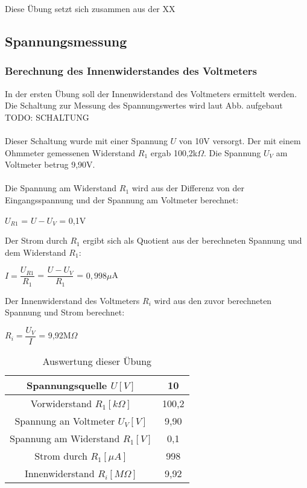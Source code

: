 Diese Übung setzt sich zusammen aus der XX

\subsection{Spannungsmessung}
\subsubsection{Berechnung des Innenwiderstandes des Voltmeters}
In der ersten Übung soll der Innenwiderstand des Voltmeters ermittelt werden. Die Schaltung zur Messung des Spannungswertes wird laut Abb. aufgebaut
~\\
TODO: SCHALTUNG		\\
~\\
Dieser Schaltung wurde mit einer Spannung $U$ von 10V versorgt. Der mit einem Ohmmeter gemessenen Widerstand $R_1$ ergab 100,2k$\Omega$. Die Spannung $U_V$ am Voltmeter betrug 9,90V.	\\
~\\
Die Spannung am Widerstand $R_1$ wird aus der Differenz von der Eingangsspannung und der Spannung am Voltmeter berechnet: 
\begin{center}
$U_{R1}$ = $U - U_V$ = 0,1V
\end{center}
Der Strom durch $R_1$ ergibt sich als Quotient aus der berechneten Spannung und dem Widerstand $R_1$:
\begin{center}
$I = \dfrac{U_{R1}}{R_1}$ = $\dfrac{U - U_V}{R_1}$ = $0,998\mu$A
\end{center}
Der Innenwiderstand des Voltmeters $R_i$ wird aus den zuvor berechneten Spannung und Strom berechnet:
\begin{center}
$R_i = \dfrac{U_V}{I}$ = 9,92M$\Omega$
\end{center}
\begin{table}[h]
	\centering
	\begin{tabular}{|c|c|}
	\hline 
	Spannungsquelle $U [V]$			& 10 		\\ 
	\hline 
	Vorwiderstand $R_1 [k\Omega]$		& 100,2	\\ 
	\hline 
	Spannung an Voltmeter $U_V [V]$ 	& 9,90	\\ 
	\hline 
	Spannung am Widerstand $R_1 [V]$	& 0,1		\\ 
	\hline 
	Strom durch $R_1 [\mu A]$		& 998		\\ 
	\hline 
	Innenwiderstand $R_i [M\Omega]$	& 9,92	\\ 
	\hline 
	\end{tabular}
	\caption{Auswertung dieser Übung}
\end{table}

